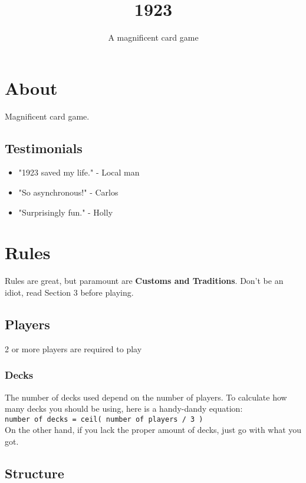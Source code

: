 \documentclass[11pt]{article}
\author{A magnificent card game}
\date{}
\title{1923}
\begin{document}
\maketitle
\tableofcontents


\section{About}
\label{sec-1}
Magnificent card game.

\subsection{Testimonials}
\label{sec-1-1}
\begin{itemize}
\item "1923 saved my life." - Local man
\item "So asynchronous!" - Carlos
\item "Surprisingly fun." - Holly
\end{itemize}


\section{Rules}
\label{sec-2}

Rules are great, but paramount are \textbf{Customs and Traditions}. Don't be
an idiot, read Section 3 before playing.

\subsection{Players}
\label{sec-2-1}
2 or more players are required to play

\subsubsection{Decks}
\label{sec-2-1-1}
The number of decks used depend on the number of players. To
calculate how many decks you should be using, here is a handy-dandy
equation:\\

\texttt{number of decks = ceil( number of players / 3 )}\\

On the other hand, if you lack the proper amount of decks, just go
with what you got. 

\subsection{Structure}
\label{sec-2-2}
\end{document}
